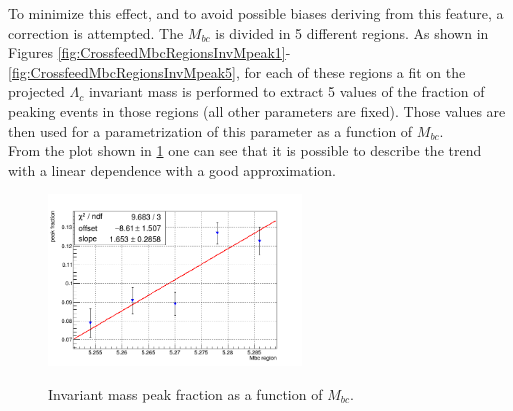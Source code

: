 To minimize this effect, and to avoid possible biases deriving from this feature, a correction is attempted. The $M_{bc}$ is divided in 5 different regions. 
As shown in Figures \ref{fig:CrossfeedMbcRegionsInvMpeak1}-\ref{fig:CrossfeedMbcRegionsInvMpeak5}, for each of these regions a fit on the projected $\Lambda_c$ invariant mass 
is performed to extract 5 values of the fraction of peaking events in those regions (all other parameters are fixed). Those values are then used for a parametrization of this 
parameter as a function of $M_{bc}$. \\
\noindent From the plot shown in \cref{fig:InvMpeak_fraction_linearFit} one can see that it is possible to describe the trend with a linear dependence with a good approximation.

\begin{figure}[H]
\centering
{\includegraphics[width=0.6\textwidth]{04-chargedCorrBtoLambda/figs/streams12345_chargedCorrLambdaC_Crossfeed_InvM_frac_param.png}}
\caption{Invariant mass peak fraction as a function of $M_{bc}$. }
\label{fig:InvMpeak_fraction_linearFit}
\end{figure}

